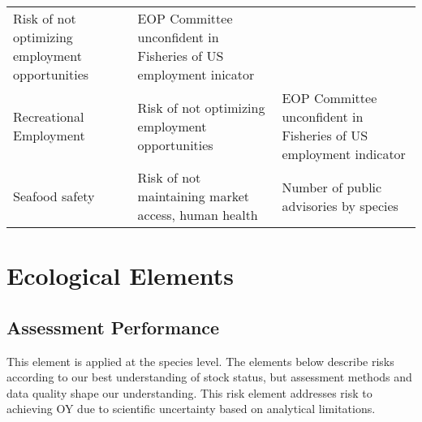 \documentclass[11pt,]{article}
\begin{document}
\begin{longtable}[]{@{}lll@{}}
\begin{minipage}[t]{0.33\columnwidth}
Risk of not optimizing employment opportunities\strut
\end{minipage} & \begin{minipage}[t]{0.33\columnwidth}\raggedright\strut
EOP Committee unconfident in Fisheries of US employment inicator\strut
\end{minipage}\tabularnewline
\begin{minipage}[t]{0.25\columnwidth}\raggedright\strut
Recreational Employment\strut
\end{minipage} & \begin{minipage}[t]{0.33\columnwidth}\raggedright\strut
Risk of not optimizing employment opportunities\strut
\end{minipage} & \begin{minipage}[t]{0.33\columnwidth}\raggedright\strut
EOP Committee unconfident in Fisheries of US employment indicator\strut
\end{minipage}\tabularnewline
\begin{minipage}[t]{0.25\columnwidth}\raggedright\strut
Seafood safety\strut
\end{minipage} & \begin{minipage}[t]{0.33\columnwidth}\raggedright\strut
Risk of not maintaining market access, human health\strut
\end{minipage} & \begin{minipage}[t]{0.33\columnwidth}\raggedright\strut
Number of public advisories by species\strut
\end{minipage}\tabularnewline
\bottomrule
\end{longtable}

\section{Ecological Elements}\label{ecological-elements}

\subsection{Assessment Performance}\label{assessment-performance}

This element is applied at the species level. The elements below
describe risks according to our best understanding of stock status, but
assessment methods and data quality shape our understanding. This risk
element addresses risk to achieving OY due to scientific uncertainty
based on analytical limitations.
\end{document}
